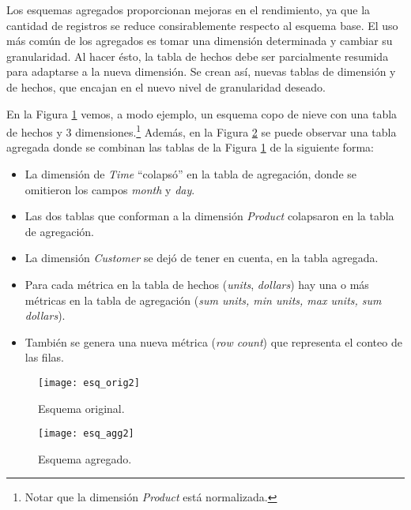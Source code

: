 \documentclass[a4paper,11pt]{article}
\begin{document}
    
    Los esquemas agregados proporcionan mejoras en el rendimiento, ya que la cantidad de registros se reduce consirablemente respecto al esquema base. El
    uso más común de los agregados es tomar una dimensión determinada y cambiar su granularidad. Al hacer ésto, la tabla de hechos debe ser parcialmente
    resumida para adaptarse a la nueva dimensión. Se crean así, nuevas tablas de dimensión y de hechos, que encajan en el nuevo nivel de granularidad deseado.
    
    En la Figura \ref{sch_orig2} vemos, a modo ejemplo, un esquema copo de nieve con una tabla de hechos y 3 dimensiones.\footnote{Notar que la
    dimensión \textit{Product} está normalizada.} Además, en la Figura \ref{sch_agg2} se puede observar una tabla agregada donde se combinan las tablas de la
    Figura \ref{sch_orig2} de la siguiente forma:
    
    \begin{itemize}
      \item La dimensión de \textit{Time} ``colapsó'' en la tabla de agregación, donde se omitieron los campos \textit{month} y \textit{day}.
      \item Las dos tablas que conforman a la dimensión \textit{Product} colapsaron en la tabla de agregación.
      \item La dimensión \textit{Customer} se dejó de tener en cuenta, en la tabla agregada.
      \item Para cada métrica en la tabla de hechos (\textit{units}, \textit{dollars}) hay una o más métricas en la tabla de 
      agregación (\textit{sum units, min units, max units, sum dollars}).
      \item También se genera una nueva métrica (\textit{row count}) que representa el conteo de las filas.
    \end{itemize}
    
    \begin{figure}
      \begin{center}
        \texttt{[image: esq\_orig2]}
        \caption{Esquema original. \cite{agg_tables}}
        \label{sch_orig2}
      \end{center}
    \end{figure}
    
    \begin{figure}
      \begin{center}
        \texttt{[image: esq\_agg2]}
        \caption{Esquema agregado. \cite{agg_tables}}
        \label{sch_agg2}
      \end{center}
    \end{figure}
    
\end{document}
